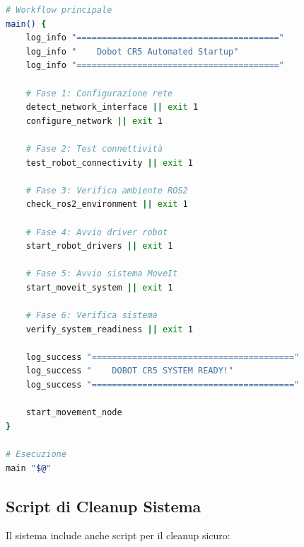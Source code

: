 \documentclass[12pt,a4paper,twoside,openright]{book}
\begin{document}
\begin{lstlisting}[language=bash, caption={Estratto dello script dobot\_startup.sh}]
# Workflow principale
main() {
    log_info "========================================"
    log_info "    Dobot CR5 Automated Startup"
    log_info "========================================"
    
    # Fase 1: Configurazione rete
    detect_network_interface || exit 1
    configure_network || exit 1
    
    # Fase 2: Test connettività
    test_robot_connectivity || exit 1
    
    # Fase 3: Verifica ambiente ROS2
    check_ros2_environment || exit 1
    
    # Fase 4: Avvio driver robot
    start_robot_drivers || exit 1
    
    # Fase 5: Avvio sistema MoveIt
    start_moveit_system || exit 1
    
    # Fase 6: Verifica sistema
    verify_system_readiness || exit 1
    
    log_success "========================================"
    log_success "    DOBOT CR5 SYSTEM READY!"
    log_success "========================================"
    
    start_movement_node
}

# Esecuzione
main "$@"
\end{lstlisting}

\subsection{Script di Cleanup Sistema}

Il sistema include anche script per il cleanup sicuro:
\end{document}

